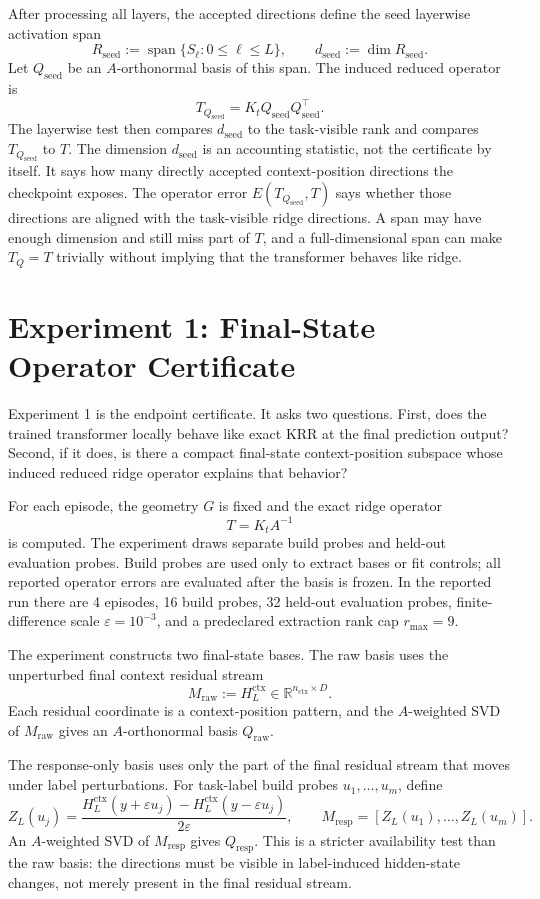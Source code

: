 \documentclass[11pt]{article}
\newcommand{\R}{\mathbb{R}}
\newcommand{\spanop}{\operatorname{span}}
\begin{document}
After processing all layers, the accepted directions define the seed layerwise activation span
\[
R_{\mathrm{seed}}
:=
\spanop\{S_\ell:0\le \ell\le L\},
\qquad
d_{\mathrm{seed}}:=\dim R_{\mathrm{seed}}.
\]
Let \(Q_{\mathrm{seed}}\) be an \(A\)-orthonormal basis of this span. The induced reduced operator is
\[
T_{Q_{\mathrm{seed}}}=K_tQ_{\mathrm{seed}}Q_{\mathrm{seed}}^\top.
\]
The layerwise test then compares \(d_{\mathrm{seed}}\) to the task-visible rank and compares
\(T_{Q_{\mathrm{seed}}}\) to \(T\). The dimension \(d_{\mathrm{seed}}\) is an accounting statistic, not
the certificate by itself. It says how many directly accepted context-position directions the
checkpoint exposes. The operator error \(E(T_{Q_{\mathrm{seed}}},T)\) says whether those directions are
aligned with the task-visible ridge directions. A span may have enough dimension and still miss part
of \(T\), and a full-dimensional span can make \(T_Q=T\) trivially without implying that the
transformer behaves like ridge.

\section{Experiment 1: Final-State Operator Certificate}

Experiment 1 is the endpoint certificate. It asks two questions. First, does the trained
transformer locally behave like exact KRR at the final prediction output? Second, if it does, is
there a compact final-state context-position subspace whose induced reduced ridge operator explains
that behavior?

For each episode, the geometry \(G\) is fixed and the exact ridge operator
\[
T=K_tA^{-1}
\]
is computed. The experiment draws separate build probes and held-out evaluation probes. Build
probes are used only to extract bases or fit controls; all reported operator errors are evaluated
after the basis is frozen. In the reported run there are 4 episodes, 16 build probes, 32 held-out
evaluation probes, finite-difference scale \(\varepsilon=10^{-3}\), and a predeclared extraction rank
cap \(r_{\max}=9\).

The experiment constructs two final-state bases. The raw basis uses the unperturbed final context
residual stream
\[
M_{\mathrm{raw}}:=H_L^{\mathrm{ctx}}\in\R^{n_{\mathrm{ctx}}\times D}.
\]
Each residual coordinate is a context-position pattern, and the \(A\)-weighted SVD of
\(M_{\mathrm{raw}}\) gives an \(A\)-orthonormal basis \(Q_{\mathrm{raw}}\).

The response-only basis uses only the part of the final residual stream that moves under label
perturbations. For task-label build probes \(u_1,\ldots,u_m\), define
\[
Z_L(u_j)=
\frac{
H_L^{\mathrm{ctx}}(y+\varepsilon u_j)-H_L^{\mathrm{ctx}}(y-\varepsilon u_j)
}{2\varepsilon},
\qquad
M_{\mathrm{resp}}=[Z_L(u_1),\ldots,Z_L(u_m)].
\]
An \(A\)-weighted SVD of \(M_{\mathrm{resp}}\) gives \(Q_{\mathrm{resp}}\). This is a stricter
availability test than the raw basis: the directions must be visible in label-induced hidden-state
changes, not merely present in the final residual stream.
\end{document}
